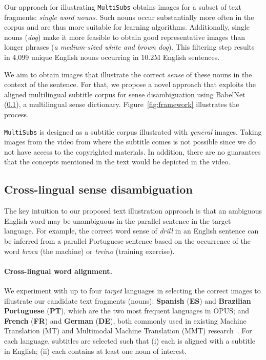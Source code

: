 \documentclass[twocolumn]{svjour3}          \smartqed  \usepackage{graphicx}
\newcommand{\multisubs}{\texttt{MultiSubs}\xspace}
\begin{document}
Our approach for illustrating \multisubs obtains images for a subset of text fragments: 
\emph{single word nouns}.
Such nouns occur substantially more often in the corpus and are thus more suitable for learning algorithms. Additionally, single nouns (\emph{dog}) make it more feasible to obtain good representative images than longer phrases (\emph{a medium-sized white and brown dog}). This filtering step results in 4,099 unique English nouns occurring in 10.2M English sentences.

We aim to obtain images that illustrate the correct \emph{sense} of these nouns in the context of the sentence. For that, we propose a novel approach that exploits the aligned multilingual subtitle corpus for sense disambiguation using BabelNet~\cite{NavigliPonzetto:2012} (\ref{sec:phrase-disambiguation}), a multilingual sense dictionary. Figure~\ref{fig:framework} illustrates the process.
 
 \multisubs is designed as a subtitle corpus illustrated with \emph{general} images. Taking images from the video from where the subtitle comes is not possible since we do not have access to the copyrighted materials. In addition, there are no guarantees that the concepts mentioned in the text would be depicted in the video.





\subsection{Cross-lingual sense disambiguation}
\label{sec:phrase-disambiguation}

The key intuition to our proposed text illustration approach is that an ambiguous English word may be unambiguous in the parallel sentence in the target language. For example, the correct word sense of \textit{drill} in an English sentence can be inferred from a parallel Portuguese sentence based on the occurrence of the word \textit{broca} (the machine) or \textit{treino} (training exercise).

\paragraph{Cross-lingual word alignment.} We experiment with up to four \emph{target} languages in selecting the correct images to illustrate our candidate text fragments (nouns): \textbf{Spanish} (\textbf{ES}) and \textbf{Brazilian Portuguese} (\textbf{PT}), which are the two most frequent languages in OPUS; and \textbf{French} (\textbf{FR}) and \textbf{German} (\textbf{DE}), both commonly used in existing Machine Translation (MT) and Multimodal Machine Translation (MMT) research~\cite{ElliottEtAl:2017}. For each language, subtitles are selected such that (i) each is aligned with a subtitle in English; (ii) each contains at least one noun of interest.
\end{document}
